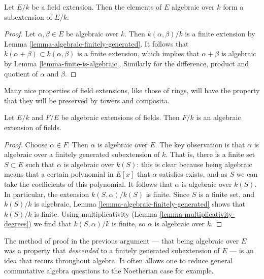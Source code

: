 \begin{lemma}
\label{lemma-algebraic-elements}
Let $E/k$ be a field extension. Then the elements of $E$ algebraic over $k$
form a subextension of $E/k$.
\end{lemma}

\begin{proof}
Let $\alpha, \beta \in E$ be algebraic over $k$. Then $k(\alpha, \beta)/k$
is a finite extension by Lemma \ref{lemma-algebraic-finitely-generated}.
It follows that $k(\alpha + \beta) \subset k(\alpha, \beta)$ is a finite
extension, which implies that $\alpha + \beta$ is algebraic by
Lemma \ref{lemma-finite-is-algebraic}. Similarly for the difference,
product and quotient of $\alpha$ and $\beta$.
\end{proof}

\noindent
Many nice properties of field extensions, like those of rings, will have the
property that they will be preserved by towers and composita.

\begin{lemma}
\label{lemma-algebraic-permanence}
Let $E/k$ and $F/E$ be algebraic extensions of fields. Then $F/k$ is an
algebraic extension of fields.
\end{lemma}

\begin{proof}
Choose $\alpha \in F$. Then $\alpha$ is algebraic over $E$.
The key observation is that $\alpha$ is algebraic over a
finitely generated subextension of $k$.
That is, there is a finite set $S \subset E$ such that $\alpha $ is algebraic
over $k(S)$: this is clear because being algebraic means that a certain
polynomial in $E[x]$ that $\alpha$ satisfies exists, and as $S$ we can take the
coefficients of this polynomial. It follows that $\alpha$ is algebraic over
$k(S)$. In particular, the extension $k(S, \alpha)/ k(S)$ is finite.
Since $S$ is a finite set, and $k(S)/k$ is algebraic,
Lemma \ref{lemma-algebraic-finitely-generated} shows that
$k(S)/k$ is finite. Using multiplicativity
(Lemma \ref{lemma-multiplicativity-degrees})
we find that $k(S,\alpha)/k$ is finite, so $\alpha$ is algebraic over $k$.
\end{proof}

\noindent
The method of proof in the previous argument --- that being algebraic
over $E$ was a property that {\it descended} to a finitely generated
subextension of $E$ --- is an idea that recurs throughout algebra.
It often allows one to reduce general commutative algebra questions
to the Noetherian case for example.


